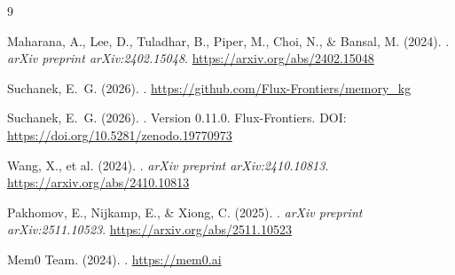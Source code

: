 \documentclass[11pt,a4paper]{article}
\begin{document}

\begin{thebibliography}{9}

Maharana, A., Lee, D., Tuladhar, B., Piper, M., Choi, N., \& Bansal, M. (2024).
.
\newblock \textit{arXiv preprint arXiv:2402.15048}.
\newblock \url{https://arxiv.org/abs/2402.15048}

Suchanek, E.~G. (2026).
.
\newblock \url{https://github.com/Flux-Frontiers/memory_kg}

Suchanek, E.~G. (2026).
.
\newblock Version 0.11.0. Flux-Frontiers.
\newblock DOI: \url{https://doi.org/10.5281/zenodo.19770973}

Wang, X., et al. (2024).
.
\newblock \textit{arXiv preprint arXiv:2410.10813}.
\newblock \url{https://arxiv.org/abs/2410.10813}

Pakhomov, E., Nijkamp, E., \& Xiong, C. (2025).
.
\newblock \textit{arXiv preprint arXiv:2511.10523}.
\newblock \url{https://arxiv.org/abs/2511.10523}

{Mem0 Team}. (2024).
.
\newblock \url{https://mem0.ai}

\end{thebibliography}
\end{document}
